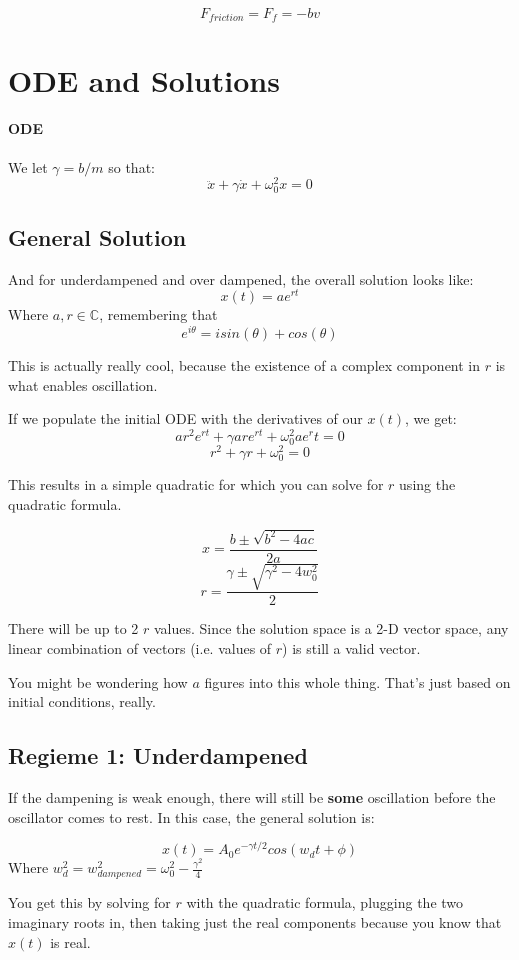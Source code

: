 \documentclass[a4paper,12pt]{report}
\begin{document}
$$F_{friction} = F_f = -bv$$

\section{ODE and Solutions}
\paragraph{ODE}
We let $\gamma = b/m$ so that:
$$\ddot{x} + \gamma \dot{x} + \omega_0^2 x = 0$$

\subsection{General Solution}

And for underdampened and over dampened, the overall solution looks like:
$$x(t) = ae^{rt}$$
Where $a, r \in \mathbb{C}$, remembering that $$e^{i \theta} = i sin(\theta) + cos(\theta)$$

This is actually really cool, because the existence of a complex component in $r$ is what 
enables oscillation. 

If we populate the initial ODE with the derivatives of our $x(t)$, we get:
$$ar^2e^{rt} + \gamma are^{rt} + \omega_0^2 ae^rt = 0$$
$$r^2 + \gamma r + \omega_0^2 = 0$$

This results in a simple quadratic for which you can solve for $r$ using the quadratic formula.

$$x = \frac{b \pm \sqrt{b^2 - 4ac}}{2a}$$
$$r = \frac{\gamma \pm \sqrt{\gamma^2 - 4w_0^2}}{2}$$

There will be up to 2 $r$ values. Since the solution space is a 2-D vector space, any 
linear combination of vectors (i.e. values of $r$) is still a valid vector.

You might be wondering how $a$ figures into this whole thing. That's just based on initial
conditions, really. 

\subsection{Regieme 1: Underdampened}
If the dampening is weak enough, there will still be \textbf{some} oscillation before the 
oscillator comes to rest. In this case, the general solution is:

$$x(t) = A_0 e^{-\gamma t/2} cos(w_dt + \phi)$$
Where $w_d^2 = w_{dampened}^2 = \omega_0^2 - \frac{\gamma^2}{4}$

You get this by solving for $r$ with the quadratic formula, plugging the two imaginary 
roots in, then taking just the real components because you know that $x(t)$ is real.
\end{document}
